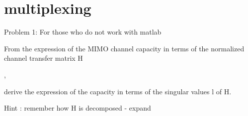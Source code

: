 \section{multiplexing}
Problem 1: For those who do not work with matlab

From the expression of the MIMO channel capacity in terms of the normalized channel transfer matrix H

,

derive the expression of the capacity in terms of the singular values l of H.

Hint : remember how H is decomposed - expand
